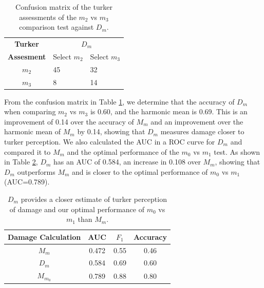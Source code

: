 \begin{table}
\centering
\begin{tabular}{cll}
\textbf{Turker} & \multicolumn{2}{c}{ \textbf{ $D_{m}$}}                           \\
\textbf{Assesment}                  &          Select $m_{2}$             &           Select $m_{3}$             \\ \cline{2-3} 
       $m_{2}$           & \multicolumn{1}{|l}{45} & \multicolumn{1}{|l|}{32} \\ \cline{2-3} 
       $m_{3}$           & \multicolumn{1}{|l}{8} & \multicolumn{1}{|l|}{14} \\ \cline{2-3} 
\end{tabular}
  \caption{Confusion matrix of the turker assessments of the $m_2$ vs $m_3$ comparison test against $D_m$.}
  \label{m2cm}
\end{table}





From the confusion matrix in Table \ref{m2cm}, we determine that the accuracy of $D_m$ when comparing $m_2$ vs $m_3$ is 0.60, and the harmonic mean is 0.69. This is an improvement of 0.14 over the accuracy of $M_m$ and an improvement over the harmonic mean of $M_m$ by 0.14, showing that $D_m$ measures damage closer to turker perception. 
We also calculated the AUC in a ROC curve for $D_m$ and compared it to $M_m$ and the optimal performance of the $m_0$ vs $m_1$ test. As shown in Table \ref{auc2}, $D_m$ has an AUC of 0.584, an increase in 0.108 over $M_m$, showing that $D_m$ outperforms $M_m$ and is closer to the optimal performance of $m_0$ vs $m_1$ (AUC=0.789).


\begin{table}
\centering
\begin{tabular}{ c | c | c | c }
    Damage Calculation &  AUC & $F_1$ & Accuracy\\
\hline
  $M_m$ & 0.472 & 0.55 & 0.46 \\
  $D_m$ & 0.584 & 0.69 & 0.60 \\
  $M_{m_0}$ & 0.789 & 0.88  & 0.80 \\
\hline
\end{tabular}
  \caption{$D_m$ provides a closer estimate of turker perception of damage and our optimal performance of $m_0$ vs $m_1$ than $M_m$.}
  \label{auc2}
\end{table}

